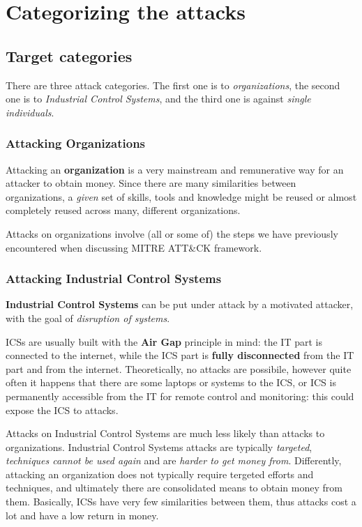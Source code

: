 \documentclass[10pt]{extbook}
\begin{document}
\chapter{Categorizing the attacks}


\section{Target categories}

There are three attack categories. The first one is to \emph{organizations},
the second one is to \emph{Industrial Control Systems}, and the third one
is against \emph{single individuals}.

\subsection{Attacking Organizations}

Attacking an \textbf{organization} is a very mainstream and remunerative way
for an attacker to obtain money. Since there are many similarities between
organizations, a \emph{given} set of skills, tools and knowledge might be
reused or almost completely reused across many, different organizations.

Attacks on organizations involve (all or some of) the steps we have previously
encountered when discussing MITRE ATT\&CK framework.

\subsection{Attacking Industrial Control Systems}

\textbf{Industrial Control Systems} can be put under attack by a motivated
attacker, with the goal of \emph{disruption of systems}.

ICSs are usually built with the \textbf{Air Gap} principle in mind: the IT part
is connected to the internet, while the ICS part is \textbf{fully disconnected}
from the IT part and from the internet. Theoretically, no attacks are
possibile, however quite often it happens that there are some laptops or
systems to the ICS, or ICS is permanently accessible from the IT for remote
control and monitoring: this could expose the ICS to attacks.

Attacks on Industrial Control Systems are much less likely than attacks to
organizations. Industrial Control Systems attacks are typically
\emph{targeted}, \emph{techniques cannot be used again} and are \emph{harder to
get money from}. Differently, attacking an organization does not typically
require tergeted efforts and techniques, and ultimately there are consolidated
means to obtain money from them. Basically, ICSs have very few similarities
between them, thus attacks cost a lot and have a low return in money.
\end{document}
